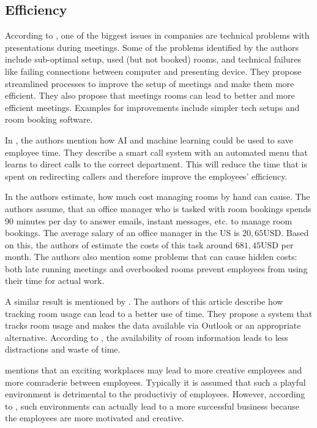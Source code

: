 \subsection{Efficiency}




According to \cite{roomzilla3}, one of the biggest issues in companies are technical problems with presentations during meetings. Some of the problems identified by the authors include sub-optimal setup, used (but not booked) rooms, and technical failures like failing connections between computer and presenting device. They propose streamlined processes to improve the setup of meetings and make them more efficient. They also propose that meetings rooms can lead to better and more efficient meetings. Examples for improvements include simpler tech setups and room booking software.

In \cite{hbcommunications}, the authors mention how AI and machine learning could be used to save employee time. They describe a smart call system with an automated menu that learns to direct calls to the correct department. This will reduce the time that is spent on redirecting callers and therefore improve the employees' efficiency. 

In \cite{roomzilla9} the authors estimate, how much cost managing rooms by hand can cause. The authors assume, that an office manager who is tasked with room bookings spends 90 minutes per day to answer emails, instant messages, etc. to manage room bookings. The average salary of an office manager in the US is \(20,65\text{USD}\). Based on this, the authors of \cite{roomzilla9} estimate the costs of this task around \(681,45\text{USD}\) per month. The authors also mention some problems that can cause hidden costs: both late running meetings and overbooked rooms prevent employees from using their time for actual work. 

A similar result is mentioned by \cite{iotagenda}. The authors of this article describe how tracking room usage can lead to a better use of time. They propose a system that tracks room usage and makes the data available via Outlook or an appropriate alternative. According to \cite{iotagenda}, the availability of room information leads to less distractions and waste of time. 


\cite{roomzilla3} mentions that an exciting workplaces may lead to more creative employees and more comraderie between employees. Typically it is assumed that such a playful environment is detrimental to the productiviy of employees. However, according to \cite{metroffice}, such environments can actually lead to a more successful business because the employees are more motivated and creative.


